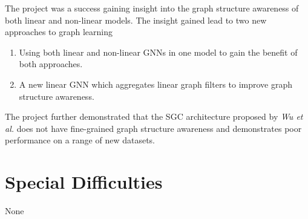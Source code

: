 \documentclass[12pt,a4paper,openany,openright]{report}
\begin{document}
The project was a success gaining insight into the graph structure awareness of both linear and non-linear models.
The insight gained lead to two new approaches to graph learning
\begin{enumerate}
    \item Using both linear and non-linear GNNs in one model to gain the benefit of both approaches.
    \item A new linear GNN which aggregates linear graph filters to improve graph structure awareness.
\end{enumerate}
The project further demonstrated that the SGC architecture proposed by \textit{Wu et al.} does not have fine-grained graph structure awareness and demonstrates poor performance on a range of new datasets.

\section*{Special Difficulties}

None


\pagestyle{headings}

\tableofcontents









\appendix







\end{document}
